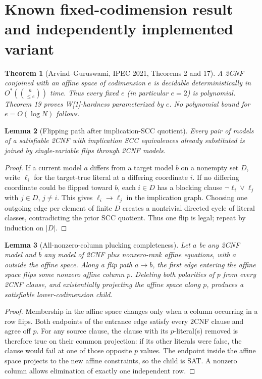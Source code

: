 \documentclass[11pt]{article}
\newtheorem{theorem}{Theorem}
\newtheorem{lemma}[theorem]{Lemma}
\begin{document}
\section{Known fixed-codimension result and independently implemented variant}
\begin{theorem}[Arvind--Guruswami, IPEC 2021, Theorems 2 and 17]
A 2CNF conjoined with an affine space of codimension $e$
is decidable deterministically in $O^*(\binom n{\le e})$ time.
Thus every \emph{fixed} $e$ (in particular $e=2$) is polynomial.
Theorem 19 proves W[1]-hardness parameterized by $e$.
No polynomial bound for $e=O(\log N)$ follows.
\end{theorem}
\begin{lemma}[Flipping path after implication-SCC quotient]
Every pair of models of a satisfiable 2CNF with implication SCC equivalences
already substituted is joined by single-variable flips through 2CNF models.
\end{lemma}
\begin{proof}
If a current model $a$ differs from a target model $b$
on a nonempty set $D$, write $\ell_i$ for the target-true literal
at a differing coordinate $i$.
If no differing coordinate could be flipped toward $b$,
each $i\in D$ has a blocking clause
$\neg\ell_i\lor\ell_j$ with $j\in D$, $j\ne i$.
This gives $\ell_i\to\ell_j$ in the implication graph.
Choosing one outgoing edge per element of finite $D$ creates
a nontrivial directed cycle of literal classes, contradicting
the prior SCC quotient.
Thus one flip is legal; repeat by induction on $|D|$.
\end{proof}
\begin{lemma}[All-nonzero-column plucking completeness]
Let $a$ be any 2CNF model and $b$ any model of 2CNF plus
nonzero-rank affine equations, with $a$ outside the affine space.
Along a flip path $a\to b$, the first edge entering the
affine space flips some nonzero affine column $p$.
Deleting both polarities of $p$ from every 2CNF clause,
and existentially projecting the affine space along $p$,
produces a satisfiable lower-codimension child.
\end{lemma}
\begin{proof}
Membership in the affine space changes only when a column
occurring in a row flips. Both endpoints of the entrance edge
satisfy every 2CNF clause and agree off $p$.
For any source clause, the clause with its $p$-literal(s)
removed is therefore true on their common projection:
if its other literals were false, the clause would fail at
one of those opposite $p$ values.
The endpoint inside the affine space projects to the
new affine constraints, so the child is SAT.
A nonzero column allows elimination of exactly one independent row.
\end{proof}
\end{document}
